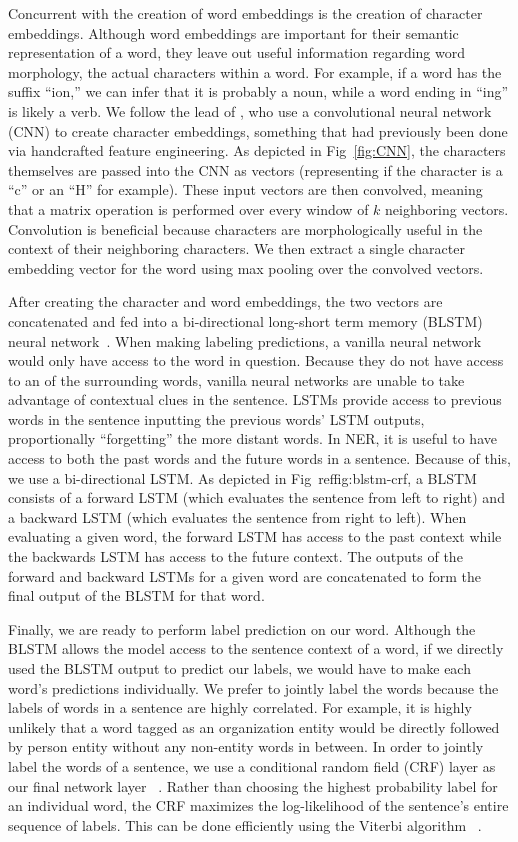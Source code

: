 Concurrent with the creation of word embeddings is the creation of character embeddings. Although word embeddings are important for their semantic representation of a word, they leave out useful information regarding word morphology, the actual characters within a word. For example, if a word has the suffix ``ion,'' we can infer that it is probably a noun, while a word ending in ``ing'' is likely a verb. We follow the lead of \cite{characterembeddings}, who use a convolutional neural network (CNN) to create character embeddings, something that had previously been done via handcrafted feature engineering. As depicted in Fig~\ref{fig:CNN}, the characters themselves are passed into the CNN as vectors (representing if the character is a ``c'' or an ``H'' for example). These input vectors are then convolved, meaning that a matrix operation is performed over every window of $k$ neighboring vectors. Convolution is beneficial because characters are morphologically useful in the context of their neighboring characters. We then extract a single character embedding vector for the word using max pooling over the convolved vectors. 

After creating the character and word embeddings, the two vectors are concatenated and fed into a bi-directional long-short term memory (BLSTM) neural network~\citep{DBLP:conf/acl/MaH16}. When making labeling predictions, a vanilla neural network would only have access to the word in question. Because they do not have access to an of the surrounding words, vanilla neural networks are unable to take advantage of contextual clues in the sentence. LSTMs provide access to previous words in the sentence inputting the previous words' LSTM outputs, proportionally ``forgetting'' the more distant words. In NER, it is useful to have access to both the past words and the future words in a sentence. Because of this, we use a bi-directional LSTM. As depicted in Fig~ref{fig:blstm-crf}, a BLSTM consists of a forward LSTM (which evaluates the sentence from left to right) and a backward LSTM (which evaluates the sentence from right to left). When evaluating a given word, the forward LSTM has access to the past context while the backwards LSTM has access to the future context. The outputs of the forward and backward LSTMs for a given word are concatenated to form the final output of the BLSTM for that word.

Finally, we are ready to perform label prediction on our word.
Although the BLSTM allows the model access to the sentence context of a word, if we directly used the BLSTM output to predict our labels, we would have to make each word's predictions individually. We prefer to jointly label the words because the labels of words in a sentence are highly correlated. For example, it is highly unlikely that a word tagged as an organization entity would be directly followed by person entity without any non-entity words in between. In order to jointly label the words of a sentence, we use a conditional random field (CRF) layer as our final network layer ~\citep{DBLP:conf/acl/MaH16}. Rather than choosing the highest probability label for an individual word, the CRF maximizes the log-likelihood of the sentence's entire sequence of labels. This can be done efficiently using the Viterbi algorithm ~\citep{ViterbiAlg}.

